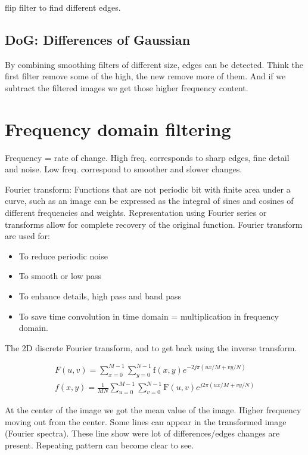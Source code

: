 flip filter to find different edges. 

\subsection*{DoG: Differences of Gaussian}
By combining smoothing filters of different size, edges can be detected. Think the first filter remove some of the high, the new remove more of them. And if we subtract the filtered images we get those higher frequency content. 

\section{Frequency domain filtering}
Frequency = rate of change. High freq. corresponds to sharp edges, fine detail and noise. Low freq. correspond to smoother and slower changes. 


Fourier transform: Functions that are not periodic bit with finite area under a curve, such as an image can be expressed as the integral of sines and cosines of different frequencies and weights. Representation using Fourier series or transforms allow for complete recovery of the original function. Fourier transform are used for: 
\begin{itemize}
	\item To reduce periodic noise
	\item To smooth or low pass
	\item To enhance details, high pass and band pass
	\item To save time convolution in time domain = multiplication in frequency domain. 
\end{itemize}

The 2D discrete Fourier transform, and to get back using the inverse transform. 

\begin{equation}
\begin{aligned}
F(u,v) = \sum_{x=0}^{M-1}\sum_{y=0}^{N-1} \text{f}(x,y)e^{-2j \pi(ux/M+vy/N)}  \\
f(x,y) = \frac{1} {MN} \sum_{u=0}^{M-1}\sum_{v=0}^{N-1} \text{F}(u,v) e^{j2\pi (ux/M + vy/N)}
\end{aligned}
\end{equation}


At the center of the image we got the mean value of the image. Higher frequency moving out from the center. Some lines can appear in the transformed image (Fourier spectra). These line show were lot of differences/edges changes are present. Repeating pattern can become clear to see. 

